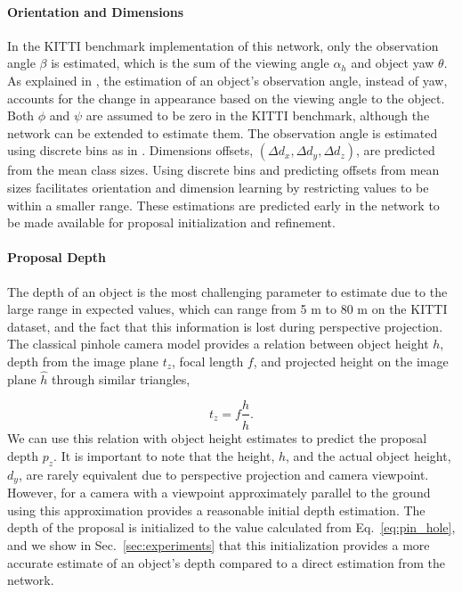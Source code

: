 \documentclass[10pt,twocolumn,letterpaper]{article}
\begin{document}
	\paragraph{Orientation and Dimensions}
	In the KITTI benchmark implementation of this network, only the observation angle $\beta$ is estimated, which is the sum of the viewing angle $\alpha_h$ and object yaw $\theta$. As explained in \cite{mousavian_deep3dbox}, the estimation of an object's observation angle, instead of yaw, accounts for the change in appearance based on the viewing angle to the object. Both $\phi$ and $\psi$ are assumed to be zero in the KITTI benchmark, although the network can be extended to estimate them. The observation angle is estimated using discrete bins as in \cite{qi_fpointnet}. Dimensions offsets, $(\Delta d_x, \Delta d_y, \Delta d_z)$, are predicted from the mean class sizes. Using discrete bins and predicting offsets from mean sizes facilitates orientation and dimension learning by restricting values to be within a smaller range. These estimations are predicted early in the network to be made available for proposal initialization and refinement.
	
	\paragraph{Proposal Depth} The depth of an object is the most challenging parameter to estimate due to the large range in expected values, which can range from 5 m to 80 m on the KITTI dataset, and the fact that this information is lost during perspective projection. The classical pinhole camera model provides a relation between object height $h$, depth from the image plane $t_z$, focal length $f$, and projected height on the image plane $\hat{h}$ through similar triangles,
	
	\begin{equation}
	t_z = f \frac{h}{\hat{h}}.
	\label{eq:pin_hole}
	\end{equation}
We can use this relation with object height estimates to predict the proposal depth $p_z$. It is important to note that the height, $h$, and the actual object height, ${d_y}$, are rarely equivalent due to perspective projection and camera viewpoint. However, for a camera with a viewpoint approximately parallel to the ground using this approximation provides a reasonable initial depth estimation. The depth of the proposal is initialized to the value calculated from Eq.~\ref{eq:pin_hole}, and we show in Sec.~\ref{sec:experiments} that this initialization provides a more accurate estimate of an object's depth compared to a direct estimation from the network.
	
\end{document}
